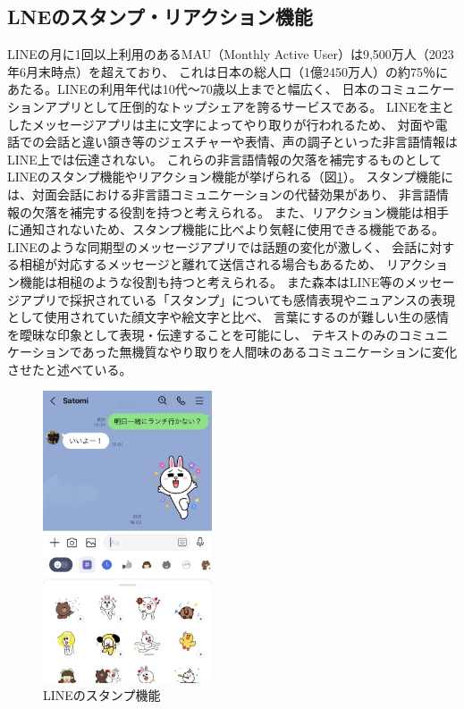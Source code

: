 \documentclass[11pt,a4paper]{ltjsreport}
\begin{document}
\subsection{LNEのスタンプ・リアクション機能}
LINEの月に1回以上利用のあるMAU（Monthly Active User）は9,500万人（2023年6月末時点）を超えており、
これは日本の総人口（1億2450万人）の約75％にあたる。LINEの利用年代は10代〜70歳以上までと幅広く、
日本のコミュニケーションアプリとして圧倒的なトップシェアを誇るサービスである\cite{Web2}。
LINEを主としたメッセージアプリは主に文字によってやり取りが行われるため、
対面や電話での会話と違い頷き等のジェスチャーや表情、声の調子といった非言語情報はLINE上では伝達されない。
これらの非言語情報の欠落を補完するものとしてLINEのスタンプ機能やリアクション機能が挙げられる（図\ref{figure:LINE_stamp}）。
スタンプ機能には、対面会話における非言語コミュニケーションの代替効果があり、
非言語情報の欠落を補完する役割を持つと考えられる。\cite{Thesis_Morimoto}
また、リアクション機能は相手に通知されないため、スタンプ機能に比べより気軽に使用できる機能である。
LINEのような同期型のメッセージアプリでは話題の変化が激しく、
会話に対する相槌が対応するメッセージと離れて送信される場合もあるため\cite{Thesis_Morimoto}、
リアクション機能は相槌のような役割も持つと考えられる。
また森本はLINE等のメッセージアプリで採択されている「スタンプ」についても感情表現やニュアンスの表現として使用されていた顔文字や絵文字と比べ、
言葉にするのが難しい生の感情を曖昧な印象として表現・伝達することを可能にし、
テキストのみのコミュニケーションであった無機質なやり取りを人間味のあるコミュニケーションに変化させたと述べている\cite{Thesis_Morimoto}。

\begin{figure}[htbp]
    \begin{center}
        \includegraphics[width=50mm]{PDF/LINE_stamp.jpg}
        \caption{LINEのスタンプ機能}
        \label{figure:LINE_stamp}
    \end{center}
\end{figure}
\end{document}
